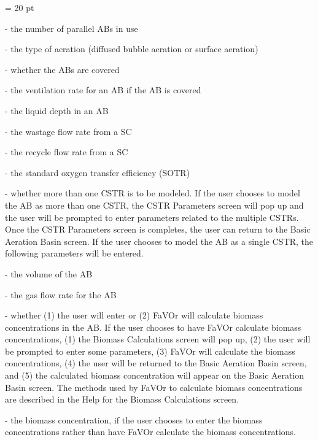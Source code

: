 {\parindent = 20 pt

\item{-} the number of parallel ABs in use

\item{-} the type of aeration (diffused bubble aeration or surface aeration) 

\item{-} whether the ABs are covered 

\item{-} the ventilation rate for an AB if the AB is covered

\item{-} the liquid depth in an AB

\item{-} the wastage flow rate from a SC 

\item{-} the recycle flow rate from a SC 

\item{-} the standard oxygen transfer efficiency (SOTR)

\item{-} whether more than one CSTR is to be modeled. If the user chooses to
model the AB as more than one CSTR, the CSTR Parameters screen will pop up and
the user will be prompted to enter parameters related to the multiple CSTRs.
Once the CSTR Parameters screen is completes, the user can return to the Basic
Aeration Basin screen.  If the user chooses to model the AB as a single CSTR,
the following parameters will be entered.

\item{-} the volume of the AB

\item{-} the gas flow rate for the AB

\item{-} whether (1) the user will enter or (2) FaVOr will calculate biomass
concentrations in the AB. If the user chooses to have FaVOr calculate biomass
concentrations, (1) the Biomass Calculations screen will pop up, (2) the user
will be prompted to enter some parameters, (3) FaVOr will calculate the biomass
concentrations, (4) the user will be returned to the Basic Aeration Basin
screen, and (5) the calculated biomass concentration will appear on the Basic
Aeration Basin screen.  The methods used by FaVOr to calculate biomass
concentrations are described in the Help for the Biomass Calculations screen.

\item{-} the biomass concentration, if the user chooses to enter the biomass
concentrations rather than have FaVOr calculate the biomass concentrations. 

}

